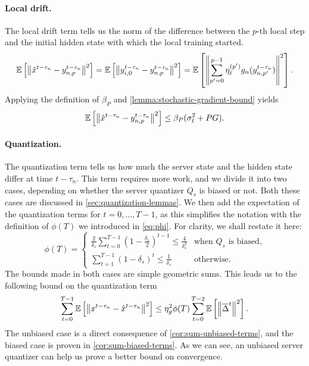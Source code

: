 \paragraph{Local drift.}
The local drift term tells us the norm of the difference between the $p$-th local step and the initial hidden state with which the local training started.
\begin{equation}
    \mathbb{E}\left[\left\lVert\hat x^{t-\tau_n} - y^{t-\tau_n}_{n,p}\right\rVert^2 \right] = \mathbb{E}\left[\left\lVert y^{t-\tau_n}_{i,0} - y^{t-\tau_n}_{n,p}\right\rVert^2\right] = \mathbb{E}\left[ \left\lVert\sum_{p'=0}^{p-1}  \eta^{(p')}_{\ell}g_n(y^{t-\tau_n}_{n,p'}) \right\rVert^2\right].
\end{equation}
Applying the definition of $\beta_P$ and \cref{lemma:stochastic-gradient-bound} yields
\begin{equation} \label{eq:bound-drift}
    \mathbb{E}\left[\left\lVert\hat x^{t-\tau_n} - y^{t-\tau_n}_{n,p}\right\rVert^2 \right] \leq \beta_P( \sigma_{\ell}^2 + PG ).
\end{equation}

\paragraph{Quantization.}
The quantization term tells us how much the server state and the hidden state differ at time $t-\tau_n$.
This term requires more work, and we divide it into two cases, depending on whether the server quantizer $Q_s$ is biased or not.
Both these cases are discussed in \cref{sec:quantization-lemmas}.
We then add the expectation of the quantization terms for $t=0, \ldots, T-1$, as this simplifies the notation with the definition of $\phi(T)$ we introduced in \eqref{eq:phi}.
For clarity, we shall restate it here:
\begin{equation}
    \phi(T) =
    \begin{cases}
        \frac{2}{\delta_s}\sum_{t=0}^{T-1} (1-\tfrac{\delta_s}{2})^{t-1} \leq \frac{4}{\delta_s^2} & \text{when $Q_s$ is biased,} \\
        \sum_{t=1}^{T-1} (1-\delta_s)^t \leq \frac{1}{\delta_s}                                    & \text{otherwise.}
    \end{cases}
\end{equation}
The bounds made in both cases are simple geometric sums.
This leads us to the following bound on the quantization term
\begin{equation} \label{eq:bound-quantization-term}
    \sum_{t=0}^{T-1} \mathbb{E}\left[\left\lVert x^{t-\tau_n} - \hat x^{t-\tau_n} \right\rVert^2\right] \leq \eta_g^2 \phi(T) \sum_{t=0}^{T-2} \mathbb{E}\left[\left\lVert\overline{\Delta}^t\right\rVert^2\right].
\end{equation}
The unbiased case is a direct consequence of \cref{cor:sum-unbiased-terms}, and the biased case is proven in \cref{cor:sum-biased-terms}.
As we can see, an unbiased server quantizer can help us prove a better bound on convergence.

